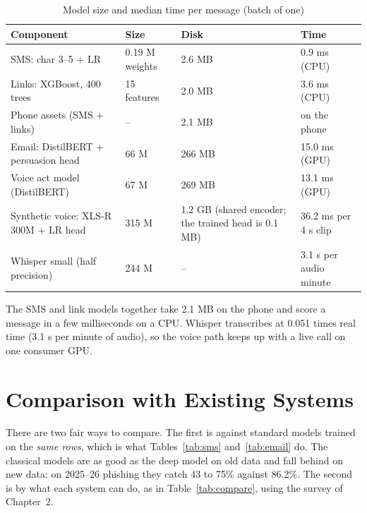 {\begin{table}[H]
\caption{Model size and median time per message (batch of one)}
\label{tab:cost}
\centering\small{}
\begin{tabular}{|p{5.6cm}|p{2.6cm}|p{2.6cm}|p{3.0cm}|}
\hline
\textbf{Component} & \textbf{Size} & \textbf{Disk} & \textbf{Time} \\ \hline
SMS: char 3--5 + LR & 0.19 M weights & 2.6 MB & 0.9 ms (CPU) \\ \hline
Links: XGBoost, 400 trees & 15 features & 2.0 MB & 3.6 ms (CPU) \\ \hline
Phone assets (SMS + links) & -- & 2.1 MB & on the phone \\ \hline
Email: DistilBERT + persuasion head & 66 M & 266 MB & 15.0 ms (GPU) \\ \hline
Voice act model (DistilBERT) & 67 M & 269 MB & 13.1 ms (GPU) \\ \hline
Synthetic voice: XLS-R 300M + LR head & 315 M & 1.2 GB (shared encoder; the trained head is 0.1 MB) & 36.2 ms per 4 s clip \\ \hline
Whisper small (half precision) & 244 M & -- & 3.1 s per audio minute \\ \hline
\end{tabular}
\end{table}

The SMS and link models together take 2.1 MB on the phone and score a message in a few milliseconds on a CPU. Whisper transcribes at 0.051 times real time (3.1 s per minute of audio), so the voice path keeps up with a live call on one consumer GPU.

\section{Comparison with Existing Systems}
There are two fair ways to compare. The first is against standard models trained on the \emph{same rows}, which is what Tables~\ref{tab:sms} and~\ref{tab:email} do. The classical models are as good as the deep model on old data and fall behind on new data: on 2025--26 phishing they catch 43 to 75\% against 86.2\%. The second is by what each system can do, as in Table~\ref{tab:compare}, using the survey of Chapter~2.

}
